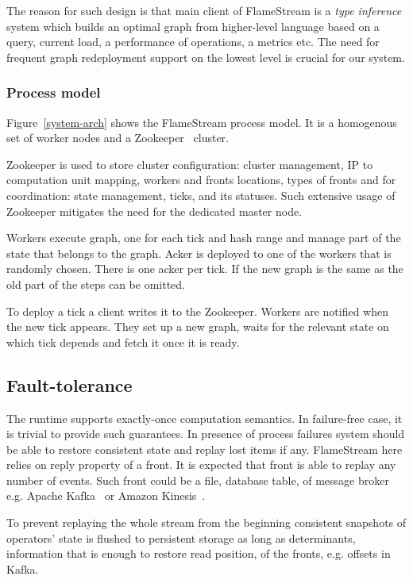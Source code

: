 The reason for such design is that main client of FlameStream is a {\it type inference} system which builds an optimal graph from higher-level language based on a query, current load, a performance of operations, a metrics etc. The need for frequent graph redeployment support on the lowest level is crucial for our system.

\subsubsection{Process model}
Figure~\ref{system-arch} shows the FlameStream process model. It is a homogenous set of worker nodes and a Zookeeper~\cite{hunt2010zookeeper} cluster. 

Zookeeper is used to store cluster configuration: cluster management, IP to computation unit mapping, workers and fronts locations, types of fronts and for coordination: state management, ticks, and its statuses. Such extensive usage of Zookeeper mitigates the need for the dedicated master node.

Workers execute graph, one for each tick and hash range and manage part of the state that belongs to the graph. Acker is deployed to one of the workers that is randomly chosen. There is one acker per tick. If the new graph is the same as the old part of the steps can be omitted.

To deploy a tick a client writes it to the Zookeeper. Workers are notified when the new tick appears. They set up a new graph, waits for the relevant state on which tick depends and fetch it once it is ready.

\subsection{Fault-tolerance}
The runtime supports exactly-once computation semantics. In failure-free case, it is trivial to provide such guarantees. In presence of process failures system should be able to restore consistent state and replay lost items if any. FlameStream here relies on reply property of a front. It is expected that front is able to replay any number of events. Such front could be a file, database table, of message broker e.g. Apache Kafka~\cite{kreps2011kafka} or Amazon Kinesis~\cite{amazon-kinesis}. 

To prevent replaying the whole stream from the beginning consistent snapshots of operators' state is flushed to persistent storage as long as determinants, information that is enough to restore read position, of the fronts, e.g. offsets in Kafka. 

